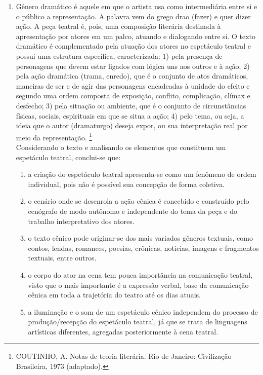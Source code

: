 \documentclass[10pt,a4paper]{article}
\begin{document}
\begin{multicols}{2}
\begin{enumerate}
	\item G\^enero dram\'atico \'e aquele em que o artista usa como intermedi\'aria entre si e o p\'ublico a representa\c{c}\~ao. A palavra vem do grego drao (fazer) e quer dizer a\c{c}\~ao. A pe\c{c}a teatral \'e, pois, uma composi\c{c}\~ao liter\'aria destinada \`a apresenta\c{c}\~ao por atores em um palco, atuando e dialogando entre si. O texto dram\'atico \'e complementado pela atua\c{c}\~ao dos atores no espet\'aculo teatral e possui uma estrutura espec\'ifica, caracterizada: 1) pela presen\c{c}a de personagens que devem estar ligados com l\'ogica uns aos outros e \`a a\c{c}\~ao; 2) pela a\c{c}\~ao dram\'atica (trama, enredo), que \'e o conjunto de atos dram\'aticos, maneiras de ser e de agir das personagens encadeadas \`a unidade do efeito e segundo uma ordem composta de exposi\c{c}\~ao, conflito, complica\c{c}\~ao, cl\'imax e desfecho; 3) pela situa\c{c}\~ao ou ambiente, que \'e o conjunto de circunstâncias f\'isicas, sociais, espirituais em que se situa a a\c{c}\~ao; 4) pelo tema, ou seja, a ideia que o autor (dramaturgo) deseja expor, ou sua interpreta\c{c}\~ao real por meio da representa\c{c}\~ao. \footnote{COUTINHO, A. Notas de teoria liter\'aria. Rio de Janeiro: Civiliza\c{c}\~ao Brasileira, 1973 (adaptado).} \\
	Considerando o texto e analisando os elementos que constituem um espet\'aculo teatral, conclui-se que:
		\begin{enumerate}
		\item a cria\c{c}\~ao do espet\'aculo teatral apresenta-se como um fen\^omeno de ordem individual, pois n\~ao \'e poss\'ivel sua concep\c{c}\~ao de forma coletiva.
		\item o cen\'ario onde se desenrola a a\c{c}\~ao c\^enica \'e concebido e constru\'ido pelo cen\'ografo de modo aut\^onomo e independente do tema da pe\c{c}a e do trabalho interpretativo dos atores.
		\item o texto c\^enico pode originar-se dos mais variados g\^eneros textuais, como contos, lendas, romances, poesias, cr\^onicas, not\'icias, imagens e fragmentos textuais, entre outros.
		\item  o  corpo do ator na cena tem pouca  importância na comunica\c{c}\~ao teatral, visto que o mais importante \'e a express\~ao verbal, base da comunica\c{c}\~ao c\^enica em toda a trajet\'oria do teatro at\'e os dias atuais.
		\item a ilumina\c{c}\~ao e o som de um espet\'aculo c\^enico independem do processo de produ\c{c}\~ao/recep\c{c}\~ao do espet\'aculo teatral, j\'a que se trata de linguagens art\'isticas diferentes, agregadas posteriormente \`a cena teatral.
		\end{enumerate}



\end{enumerate}
\end{multicols}
\end{document}
